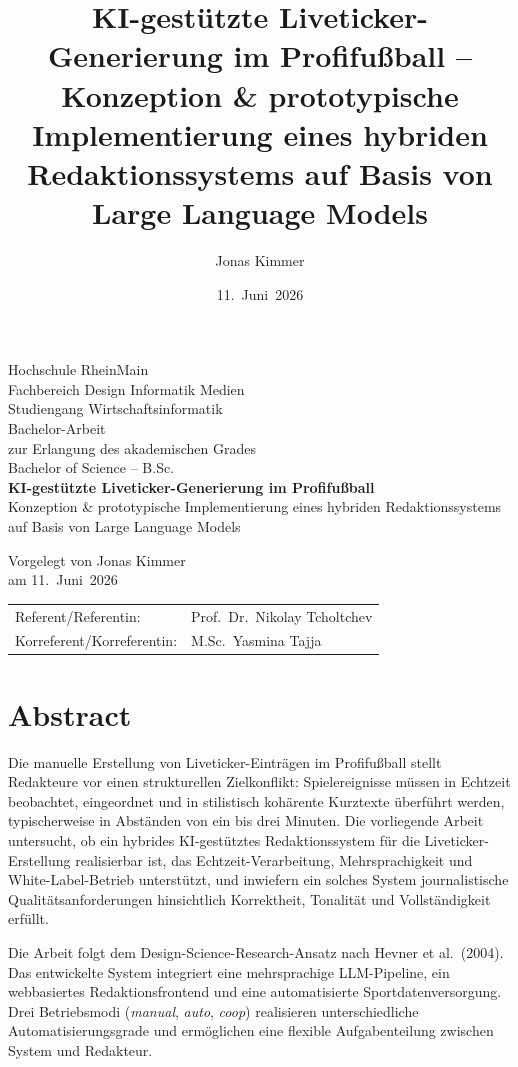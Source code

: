 \documentclass[11pt,a4paper,ngerman]{report}
\title{KI-gestützte Liveticker-Generierung im Profifußball -- Konzeption \& prototypische Implementierung eines hybriden Redaktionssystems auf Basis von Large Language Models}
\author{Jonas Kimmer}
\date{11.~Juni~2026}
\begin{document}

\begin{titlepage}
\centering
\vspace*{1cm}
Hochschule RheinMain\\
Fachbereich Design Informatik Medien\\
Studiengang Wirtschaftsinformatik\\[1.5cm]
Bachelor-Arbeit\\
zur Erlangung des akademischen Grades\\
Bachelor of Science -- B.Sc.\\[3cm]
{\LARGE \textbf{KI-gestützte Liveticker-Generierung im Profifußball}}\\[0.4cm]
{\large Konzeption \& prototypische Implementierung eines hybriden Redaktionssystems auf Basis von Large Language Models}
\vfill
\begin{flushleft}
Vorgelegt von Jonas Kimmer\\
am 11.~Juni~2026\\[0.6cm]
\begin{tabular}{@{}ll}
Referent/Referentin: & Prof.\ Dr.\ Nikolay Tcholtchev\\[0.2cm]
Korreferent/Korreferentin: & M.Sc.\ Yasmina Tajja
\end{tabular}
\end{flushleft}
\end{titlepage}


\chapter*{Abstract}

Die manuelle Erstellung von Liveticker-Einträgen im Profifußball stellt Redakteure vor einen strukturellen Zielkonflikt: Spielereignisse müssen in Echtzeit beobachtet, eingeordnet und in stilistisch kohärente Kurztexte überführt werden, typischerweise in Abständen von ein bis drei Minuten. Die vorliegende Arbeit untersucht, ob ein hybrides KI-gestütztes Redaktionssystem für die Liveticker-Erstellung realisierbar ist, das Echtzeit-Verarbeitung, Mehrsprachigkeit und White-Label-Betrieb unterstützt, und inwiefern ein solches System journalistische Qualitätsanforderungen hinsichtlich Korrektheit, Tonalität und Vollständigkeit erfüllt.

Die Arbeit folgt dem Design-Science-Research-Ansatz nach Hevner et al.\ (2004). Das entwickelte System integriert eine mehrsprachige LLM-Pipeline, ein webbasiertes Redaktionsfrontend und eine automatisierte Sportdatenversorgung. Drei Betriebsmodi (\textit{manual}, \textit{auto}, \textit{coop}) realisieren unterschiedliche Automatisierungsgrade und ermöglichen eine flexible Aufgabenteilung zwischen System und Redakteur.
\end{document}

